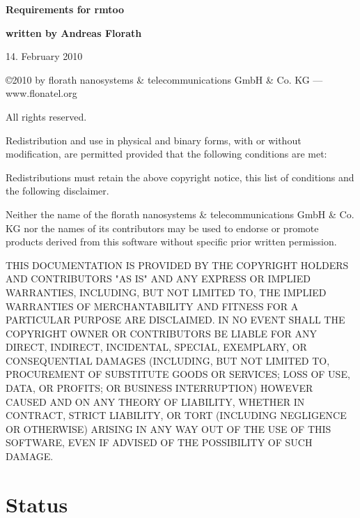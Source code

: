 \documentclass{article}
\begin{document}
\thispagestyle{empty}

\mbox{}

\vfill

{\LARGE\textbf{Requirements for rmtoo}}

\vfill

{\Large\textbf{written by Andreas Florath}}

\vfill

14. February 2010

\vfill

\newpage

\mbox{}

\vfill

{\small

\copyright 2010 by florath nanosystems \& telecommunications GmbH \& Co. KG
--- www.flonatel.org 

All rights reserved.

Redistribution and use in physical and binary forms, with or without
modification, are permitted provided that the following conditions are
met:

Redistributions must retain the above copyright notice, this list of
conditions and the following disclaimer.

Neither the name of the florath nanosystems \& telecommunications GmbH
\& Co. KG nor the names of its contributors may be used to endorse or
promote products derived from this software without specific prior
written permission.

THIS DOCUMENTATION IS PROVIDED BY THE COPYRIGHT HOLDERS AND
CONTRIBUTORS "AS IS" AND ANY EXPRESS OR IMPLIED WARRANTIES, INCLUDING,
BUT NOT LIMITED TO, THE IMPLIED WARRANTIES OF MERCHANTABILITY AND
FITNESS FOR A PARTICULAR PURPOSE ARE DISCLAIMED. IN NO EVENT SHALL THE
COPYRIGHT OWNER OR CONTRIBUTORS BE LIABLE FOR ANY DIRECT, INDIRECT,
INCIDENTAL, SPECIAL, EXEMPLARY, OR CONSEQUENTIAL DAMAGES (INCLUDING,
BUT NOT LIMITED TO, PROCUREMENT OF SUBSTITUTE GOODS OR SERVICES; LOSS
OF USE, DATA, OR PROFITS; OR BUSINESS INTERRUPTION) HOWEVER CAUSED AND
ON ANY THEORY OF LIABILITY, WHETHER IN CONTRACT, STRICT LIABILITY, OR
TORT (INCLUDING NEGLIGENCE OR OTHERWISE) ARISING IN ANY WAY OUT OF THE
USE OF THIS SOFTWARE, EVEN IF ADVISED OF THE POSSIBILITY OF SUCH
DAMAGE.
}
\newpage

\tableofcontents

\newpage

\section{Status}

\end{document}
